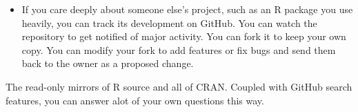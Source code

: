 \documentclass[12pt]{article}
\providecommand{\tightlist}{%
  \setlength{\itemsep}{0pt}\setlength{\parskip}{0pt}}
\begin{document}
\begin{itemize}
\tightlist
\item
  If you care deeply about someone else's project, such as an R package
  you use heavily, you can track its development on GitHub. You can
  watch the repository to get notified of major activity. You can fork
  it to keep your own copy. You can modify your fork to add features or
  fix bugs and send them back to the owner as a proposed change.
\end{itemize}

The read-only mirrors of R source and all of CRAN. Coupled with GitHub
search features, you can answer alot of your own questions this way.



\end{document}
